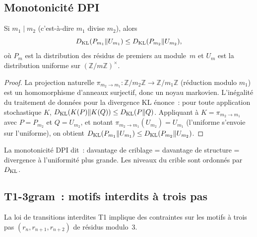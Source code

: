 \documentclass[12pt,a4paper]{article}
\begin{document}
\subsection{Monotonicité DPI}
\label{sec:dpi}

\mID
\begin{idbox}
\label{id:dpi}
Si $m_1 \mid m_2$ (c'est-à-dire $m_1$ divise $m_2$), alors
\begin{equation}
  D_{\mathrm{KL}}(P_{m_1} \| U_{m_1}) \leq D_{\mathrm{KL}}(P_{m_2} \| U_{m_2}),
  \label{eq:dpi}
\end{equation}
où $P_m$ est la distribution des résidus de premiers au module~$m$ et
$U_m$ est la distribution uniforme sur
$(\mathbb{Z}/m\mathbb{Z})^\times$.

\begin{proof}
La projection naturelle
$\pi_{m_2 \to m_1} : \mathbb{Z}/m_2\mathbb{Z} \to \mathbb{Z}/m_1\mathbb{Z}$
(réduction modulo $m_1$) est un homomorphisme d'anneaux surjectif,
donc un noyau markovien. L'inégalité du traitement de données pour la
divergence KL énonce~: pour toute application stochastique $K$,
$D_{\mathrm{KL}}(K(P) \| K(Q)) \leq D_{\mathrm{KL}}(P \| Q)$. Appliquant à
$K = \pi_{m_2 \to m_1}$ avec $P = P_{m_2}$ et $Q = U_{m_2}$, et
notant $\pi_{m_2 \to m_1}(U_{m_2}) = U_{m_1}$ (l'uniforme s'envoie
sur l'uniforme), on obtient
$D_{\mathrm{KL}}(P_{m_1} \| U_{m_1}) \leq D_{\mathrm{KL}}(P_{m_2} \| U_{m_2})$.
\end{proof}
\end{idbox}

La monotonicité DPI dit~: davantage de criblage = davantage de
structure = divergence à l'uniformité plus grande. Les niveaux du
crible sont ordonnés par $D_{\mathrm{KL}}$.

\subsection{T1-3gram~: motifs interdits à trois pas}
\label{sec:T1_3gram}

La loi de transitions interdites T1 implique des contraintes sur les
motifs à trois pas $(r_n, r_{n+1}, r_{n+2})$ de résidus modulo~3.
\end{document}
